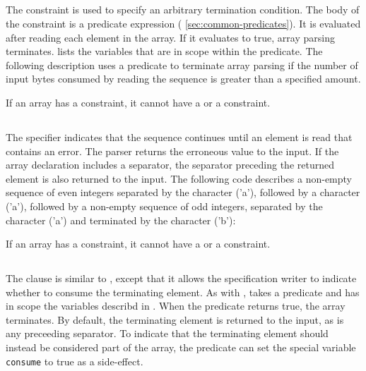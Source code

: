 

\subsection{\Plast}
The \Plast{} constraint is used to specify an arbitrary termination
condition.  The body of the constraint is a predicate expression (\cf{}
\ref{sec:common-predicates}).  It is evaluated after reading each
element in the array.  If it evaluates to true, array parsing
terminates.  lists the variables that
are in scope within the predicate.
The following description uses a \Plast{} predicate to 
terminate array parsing if the number of input bytes consumed by
reading the sequence is greater than a specified amount.

%
\noindent
If an array has a \Plast{} constraint, it cannot have a
\Plongest{} or a \Pended{} constraint.


\subsection{\Plongest{}}
The \Plongest{} specifier indicates that the sequence continues
until an element is read that contains an error.  The parser returns the
erroneous value to the input.  If the array declaration includes a
separator, the separator preceding the returned element
is also returned to the input.  The following \pads{} code describes a
non-empty sequence of even integers separated by the character
\cd('a'), followed by a character \cd('a'), followed by a non-empty
sequence of odd integers, separated by the character \cd('a') and
terminated by the character \cd('b'):

%
\noindent
If an array has a \Plongest{} constraint, it cannot have a
\Plast{} or a \Pended{} constraint.


\subsection{\Pended}
The \Pended{} clause is similar to \Plast{}, except that it allows 
the specification writer to indicate whether to consume the terminating
element.   As with \Plast{}, \Pended{} takes a predicate and has in
scope the variables describd in .  When the
predicate returns true, the array terminates.  By default, the
terminating element is returned to the input, as is any preceeding
separator.  To indicate that the terminating element should 
instead be considered part of the array, the predicate can set the
special variable \texttt{consume} to true as a side-effect. 

